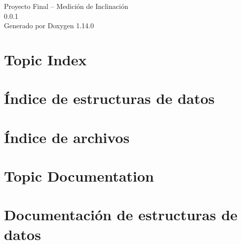 \documentclass[twoside]{book}
\newcommand{\+}{\discretionary{\mbox{\scriptsize$\hookleftarrow$}}{}{}}
\newcommand{\clearemptydoublepage}{%
    \newpage{\pagestyle{empty}\cleardoublepage}%
  }
\begin{document}
  \raggedbottom
    \hypersetup{pageanchor=false,
                bookmarksnumbered=true,
                pdfencoding=unicode
               }
  \begin{titlepage}
  \vspace*{7cm}
  \begin{center}%
  {\Large Proyecto Final – Medición de Inclinación}\\
  [1ex]\large 0.\+0.\+1 \\
  \vspace*{1cm}
  {\large Generado por Doxygen 1.14.0}\\
  \end{center}
  \end{titlepage}
  \clearemptydoublepage
  \tableofcontents
  \clearemptydoublepage
  \hypersetup{pageanchor=true}
\chapter{Topic Index}

\chapter{Índice de estructuras de datos}

\chapter{Índice de archivos}

\chapter{Topic Documentation}





\chapter{Documentación de estructuras de datos}








\end{document}
